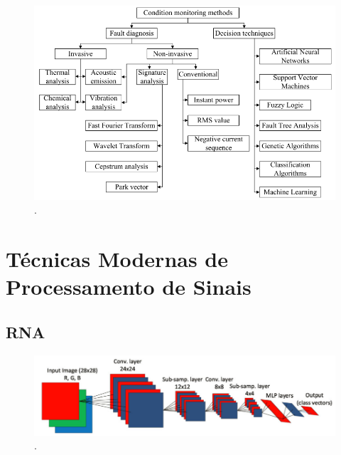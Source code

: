 \begin{figure}[H]
    \caption{.}
    \begin{center}
        \includegraphics[scale=.5]{referencial/img/monitoring_methods_rilski_p78.png}
    \end{center}
    \label{fig:}
\end{figure}

% 

\section{Técnicas Modernas de Processamento de Sinais}\label{sec:}



% 

\subsection{RNA}

\begin{figure}[H]
    \caption{.}
    \begin{center}
        \includegraphics[scale=.4]{referencial/img/cnn_image_ince_p5.png}
    \end{center}
    \label{fig:}
\end{figure}


